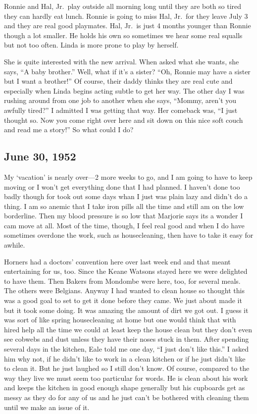 \documentclass[
]{book}
\begin{document}
Ronnie and Hal, Jr.~play outside all morning long until they are both so tired they can hardly eat lunch. Ronnie is going to miss Hal, Jr.~for they leave July 3 and they are real good playmates. Hal, Jr.~is just 4 months younger than Ronnie though a lot smaller. He holds his own so sometimes we hear some real squalls but not too often. Linda is more prone to play by herself.

She is quite interested with the new arrival. When asked what she wants, she says, ``A baby brother.'' Well, what if it's a sister? ``Oh, Ronnie may have a sister but I want a brother!'' Of course, their daddy thinks they are real cute and especially when Linda begins acting subtle to get her way. The other day I was rushing around from one job to another when she says, ``Mommy, aren't you awfully tired?'' I admitted I was getting that way. Her comeback was, ``I just thought so. Now you come right over here and sit down
on this nice soft couch and read me a story!'' So what could I do?

\hypertarget{june-30-1952}{%
\subsection{June 30, 1952}\label{june-30-1952}}

My `vacation' is nearly over---2 more weeks to go, and I am going to have to keep moving or I won't get everything done that I had planned. I haven't done too badly though for took out some days whan I just was plain lazy and didn't do a thing. I am so anemic that I take iron pills all the time and still am on the low borderline. Then my blood pressure is so low that Marjorie says its a wonder I cam move at all. Most of the time, though, I feel real good and when I do have sometimes overdone the work, such as housecleaning, then have to take it easy for awhile.

Horners had a doctors' convention here over last week end and that meant entertaining for us, too. Since the Keane Watsons stayed here we were delighted to have them. Then Bakers from Mondombe were here, too, for several meals. The others were Belgians. Anyway I had wanted to clean house so thought this was a good goal to set to get it done before they came. We just about made it but it took some doing. It was amazing the amount of dirt we got out. I guess it was sort of like spring housecleaning at home but one would think that with hired help all the time we could at least keep the house clean but they don't even see cobwebs and dust unless they have their noses stuck in them. After spending several days in the kitchen, Eale told me one day, ``I just don't like this.'' I asked him why not, if he didn't like to work in a clean kitchen or if he just didn't like to clean it. But he just laughed so I still don't know. Of course, compared to the way they live we must seem too particular for words. He is clean about his work and keeps the kitchen in good enough shape generally but his cupboards get as messy as they do for any of us and he just can't be bothered with cleaning them until we make an issue of it.
\end{document}
